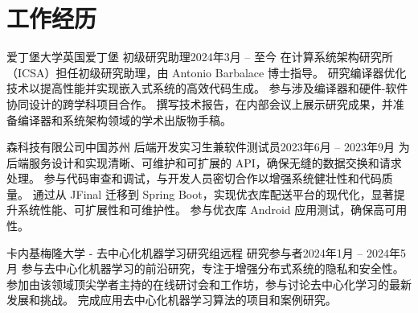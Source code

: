 \section{工作经历}
  \resumeSubHeadingListStart

    \resumeSubheading
      {爱丁堡大学}{英国爱丁堡}
      {初级研究助理}{2024年3月 -- 至今}
      \resumeItemListStart
          {在计算系统架构研究所（ICSA）担任初级研究助理，由 Antonio Barbalace 博士指导。}
          {研究编译器优化技术以提高性能并实现嵌入式系统的高效代码生成。}
          {参与涉及编译器和硬件-软件协同设计的跨学科项目合作。}
          {撰写技术报告，在内部会议上展示研究成果，并准备编译器和系统架构领域的学术出版物手稿。}
      \resumeItemListEnd

    \resumeSubheading
      {森科技有限公司}{中国苏州}
      {后端开发实习生兼软件测试员}{2023年6月 -- 2023年9月}
      \resumeItemListStart
          {为后端服务设计和实现清晰、可维护和可扩展的 API，确保无缝的数据交换和请求处理。}
          {参与代码审查和调试，与开发人员密切合作以增强系统健壮性和代码质量。}
          {通过从 JFinal 迁移到 Spring Boot，实现优衣库配送平台的现代化，显著提升系统性能、可扩展性和可维护性。}
          {参与优衣库 Android 应用测试，确保高可用性。}
      \resumeItemListEnd

    \resumeSubheading
      {卡内基梅隆大学 - 去中心化机器学习研究组}{远程}
      {研究参与者}{2024年1月 -- 2024年5月}
      \resumeItemListStart
          {参与去中心化机器学习的前沿研究，专注于增强分布式系统的隐私和安全性。}
          {参加由该领域顶尖学者主持的在线研讨会和工作坊，参与讨论去中心化学习的最新发展和挑战。}
          {完成应用去中心化机器学习算法的项目和案例研究。}
      \resumeItemListEnd

  \resumeSubHeadingListEnd